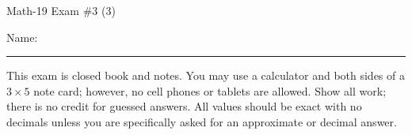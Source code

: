 \documentclass[letterpaper,12pt,fleqn]{article}
\begin{document}
\begin{center}
\Large Math-19 Exam \#3 (3)
\end{center}

\vspace{0.5in}

Name: \rule{4in}{1pt}

\vspace{0.5in}

This exam is closed book and notes. You may use a calculator and both sides of
a $3\times 5$ note card; however, no cell phones or tablets are allowed. Show
all work; there is no credit for guessed answers. All values should be exact
with no decimals unless you are specifically asked for an approximate or
decimal answer.

\vspace{0.5in}
\end{document}
